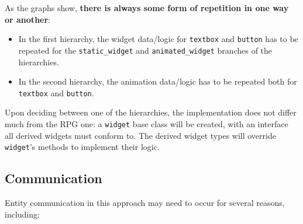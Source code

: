 \documentclass[twoside, 12pt, a4paper, openany]{book}
\begin{document}
As the graphs show, \textbf{there is always some form of repetition in
one way or another}:

\begin{itemize}
\item
  In the first hierarchy, the widget data/logic for
  \texttt{textbox}
  and
  \texttt{button}
  has to be repeated for the
  \texttt{static_widget}
  and
  \texttt{animated_widget}
  branches of the hierarchies.
\item
  In the second hierarchy, the animation data/logic has to be repeated
  both for
  \texttt{textbox}
  and
  \texttt{button}.
\end{itemize}

Upon deciding between one of the hierarchies, the implementation does
not differ much from the RPG one: a
\texttt{widget}
base class will be created, with an interface all derived widgets must
conform to. The derived widget types will override
\texttt{widget}'s
methods to implement their logic.

\hypertarget{chapter_oop_communication}{\subsection{Communication}\label{chapter_oop_communication}}

Entity communication in this approach may need to occur for several
reasons, including:
\end{document}
